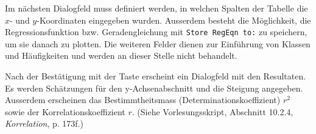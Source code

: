 \documentclass[a4paper,11pt,notitlepage,halfparskip,headsepline,normalheadings,twoside]{scrartcl}
\newlength{\tikey}
\newcommand{\keystroke}[1]{\settowidth{\tikey}{\scriptsize #1}\psframebox[framearc=0.2]{\parbox{\tikey}{\scriptsize\textsf{#1}}}}
\begin{document}
\begin{window}
Im nächsten Dialogfeld muss definiert werden, in welchen Spalten der Tabelle die
$x$- und $y$-Koordinaten eingegeben wurden. Ausserdem besteht die Möglichkeit,
die Regressionsfunktion bzw. Geradengleichung mit \texttt{Store RegEqn to:} zu
speichern, um sie danach zu plotten. Die weiteren Felder dienen zur Einführung
von Klassen und Häufigkeiten und werden an dieser Stelle nicht behandelt.
\end{window}

\begin{window}
Nach der Bestätigung mit der Taste \keystroke{ENTER} erscheint ein Dialogfeld
mit den Resultaten. Es werden Schätzungen für den y-Achsenabschnitt und die
Steigung angegeben. Ausserdem erscheinen das Bestimmtheitsmass
(Determinationskoeffizient) $r^2$ sowie der Korrelationskoeffizient $r$. (Siehe
Vorlesungsskript, Abschnitt 10.2.4, \textit{Korrelation}, p. 173f.)
\end{window}
\end{document}
